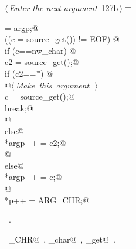 \documentclass[a4paper]{report}
\begin{document}
\begin{flushleft} \small
\begin{minipage}{\linewidth}\label{scrap269}\raggedright\small
{} $\langle\,${\it Enter the next argument}\nobreak\ {\footnotesize {127b}}$\,\rangle\equiv$
\vspace{-1ex}
\begin{list}{}{} \item
\mbox{}\verb@arg[argc] = argp;@\\
\mbox{}\verb@while ((c = source_get()) != EOF) {@\\
\mbox{}\verb@   if (c==nw_char) {@\\
\mbox{}\verb@      c2 = source_get();@\\
\mbox{}\verb@      if (c2=='\'') {@\\
\mbox{}\verb@        @\hbox{$\langle\,${\it Make this argument}\nobreak\ {\footnotesize {}}$\,\rangle$}\verb@@\\
\mbox{}\verb@        c = source_get();@\\
\mbox{}\verb@        break;@\\
\mbox{}\verb@      }@\\
\mbox{}\verb@      else@\\
\mbox{}\verb@        *argp++ = c2;@\\
\mbox{}\verb@   }@\\
\mbox{}\verb@   else@\\
\mbox{}\verb@     *argp++ = c;@\\
\mbox{}\verb@}@\\
\mbox{}\verb@*p++ = ARG_CHR;@\\
\mbox{}\verb@@{\NWsep}
\end{list}
\vspace{-1.5ex}
\footnotesize
\begin{list}{}{\setlength{\itemsep}{-\parsep}\setlength{\itemindent}{-\leftmargin}}
\item \NWtxtMacroRefIn\ .
\item \NWtxtIdentsUsed\nobreak\  \verb@ARG_CHR@\nobreak\ , \verb@nw_char@\nobreak\ , \verb@source_get@\nobreak\ .
\item{}
\end{list}
\end{minipage}\vspace{4ex}
\end{flushleft}
\end{document}
